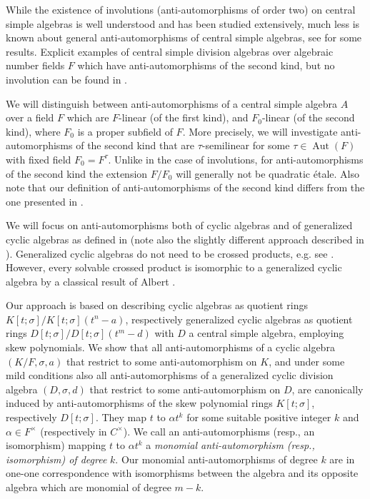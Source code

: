 \documentclass{amsart}
\theoremstyle{plain}
\theoremstyle{definition}
\numberwithin{equation}{section}
\numberwithin{figure}{section}
\DeclareMathOperator{\Aut}{Aut}
\begin{document}
While the existence of involutions (anti-automorphisms of order two)  on central simple algebras  is well understood and has been studied extensively, much less is known about general anti-automorphisms of central simple algebras,  see \cite{Lewis, Lewis2, LewisTig} for some results. Explicit examples of central simple division algebras
 over algebraic number fields $F$ which have anti-automorphisms of the second kind, but no involution can be found in \cite{MST}.



We will distinguish between anti-automorphisms of a central simple algebra $A$ over a field $F$ which are $F$-linear (of the first kind), and $F_0$-linear (of the second kind), where $F_0$ is a proper subfield of $F$. More precisely, we will investigate anti-automorphisms of the second kind that are  $\tau$-semilinear for some $\tau\in \Aut(F)$ with fixed field $F_0=F^\tau$. Unlike in the case of involutions, for anti-automorphisms of the second kind the  extension $F/F_0$ will generally not be quadratic \'etale. Also note that our definition of anti-automorphisms of the second kind differs from the one presented in \cite{Lewis2}.

 We will focus on anti-automorphisms  both of cyclic algebras and of generalized cyclic algebras as defined in \cite{J96} (note also the slightly different approach described in \cite{T}). Generalized cyclic algebras do not need to be crossed products, e.g. see \cite{TH, TH2004, TH2005}. However, every solvable crossed product is isomorphic to a generalized cyclic algebra by a classical result of Albert \cite[p.~182-187]{A}.


Our approach is based on describing cyclic algebras as quotient rings  $K[t;\sigma]/K[t;\sigma](t^n-a)$, respectively generalized cyclic algebras  as quotient rings $D[t;\sigma]/D[t;\sigma](t^m-d)$ with $D$ a central simple algebra, employing skew polynomials. We show that all anti-automorphisms of a cyclic algebra $(K/F,\sigma,a)$ that restrict to some anti-automorphism on $K$, and under some mild conditions also all anti-automorphisms of a generalized cyclic division algebra $(D,\sigma,d)$ that restrict to some anti-automorphism on  $D$, are canonically induced by anti-automorphisms of the skew polynomial rings  $K[t;\sigma]$, respectively  $D[t;\sigma]$. They map $t$ to $\alpha t^k$ for some suitable positive integer $k$ and $\alpha\in F^\times$ (respectively in $C^\times$). We call an anti-automorphisms (resp., an isomorphism) mapping $t$ to $\alpha t^k$ a \emph{monomial anti-automorphism (resp., isomorphism) of degree} $k$. Our monomial anti-automorphisms of degree $k$ are in one-one correspondence with isomorphisms between the algebra and its opposite algebra which are monomial of degree $m-k$.
 
\end{document}
